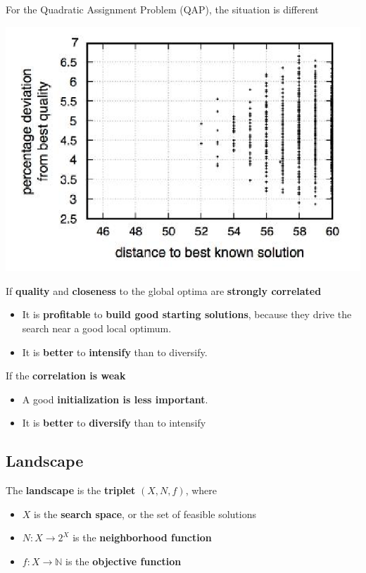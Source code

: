 For the Quadratic Assignment Problem (QAP), the situation is different
\begin{center}
	\includegraphics[width=0.7\columnwidth]{img/QAP}
\end{center}

If \textbf{quality} and \textbf{closeness} to the global optima are \textbf{strongly correlated}
\begin{itemize}
	\item It is \textbf{profitable} to \textbf{build good starting solutions}, because they drive the search near a good local optimum.\\
	
	\item It is \textbf{better} to \textbf{intensify} than to diversify.\\
\end{itemize}

If the \textbf{correlation is weak}
\begin{itemize}
	\item A good \textbf{initialization is less important}.\\
	
	\item It is \textbf{better} to \textbf{diversify} than to intensify
\end{itemize}

\newpage

\subsection{Landscape}
The \textbf{landscape} is the \textbf{triplet} $(X , N, f )$, where
\begin{itemize}
	\item $X$ is the \textbf{search space}, or the set of feasible solutions
	
	\item $N : X \rightarrow 2^X$ is the \textbf{neighborhood function}
	
	\item $f : X \rightarrow \mathbb{N}$ is the \textbf{objective function}
\end{itemize}

